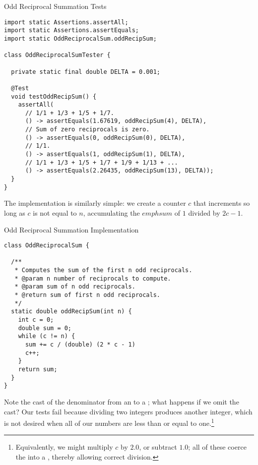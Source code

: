 
\begin{cl}{Odd Reciprocal Summation Tests}
\begin{lstlisting}[language=MyJava]
import static Assertions.assertAll;
import static Assertions.assertEquals;
import static OddReciprocalSum.oddRecipSum;

class OddReciprocalSumTester {

  private static final double DELTA = 0.001;

  @Test
  void testOddRecipSum() {
    assertAll(
      // 1/1 + 1/3 + 1/5 + 1/7.
      () -> assertEquals(1.67619, oddRecipSum(4), DELTA),
      // Sum of zero reciprocals is zero.
      () -> assertEquals(0, oddRecipSum(0), DELTA),
      // 1/1.
      () -> assertEquals(1, oddRecipSum(1), DELTA),
      // 1/1 + 1/3 + 1/5 + 1/7 + 1/9 + 1/13 + ...
      () -> assertEquals(2.26435, oddRecipSum(13), DELTA));
  }
}
\end{lstlisting}
\end{cl}

The implementation is similarly simple: we create a counter $c$ that increments so long as $c$ is not equal to $n$, accumulating the $emph{sum}$ of $1$ divided by $2c-1$.

\begin{cl}{Odd Reciprocal Summation Implementation}
\begin{lstlisting}[language=MyJava]
class OddReciprocalSum {

  /**
   * Computes the sum of the first n odd reciprocals.
   * @param n number of reciprocals to compute.
   * @param sum of n odd reciprocals.
   * @return sum of first n odd reciprocals.
   */
  static double oddRecipSum(int n) {
    int c = 0;
    double sum = 0;
    while (c != n) {
      sum += c / (double) (2 * c - 1)
      c++;
    }
    return sum;
  }
}
\end{lstlisting}
\end{cl}

Note the cast of the denominator from an  to a ; what happens if we omit the cast? Our tests fail because dividing two integers produces another integer, which is not desired when all of our numbers are less than or equal to one.\footnote{Equivalently, we might multiply $c$ by $2.0$, or subtract $1.0$; all of these coerce the  into a , thereby allowing correct division.}

